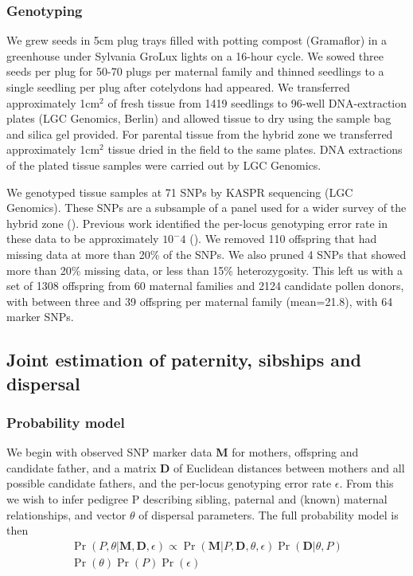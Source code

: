 \documentclass[10pt, a4paper, twocolumn]{article} %
\begin{document}
\subsubsection{Genotyping}

We grew seeds in 5cm plug trays filled with potting compost (Gramaflor) in a greenhouse under Sylvania GroLux lights on a 16-hour cycle. We sowed three seeds per plug for 50-70 plugs per maternal family and thinned seedlings to a single seedling per plug after cotelydons had appeared. We transferred approximately 1cm$^2$ of fresh tissue from 1419 seedlings to 96-well DNA-extraction plates (LGC Genomics, Berlin) and allowed tissue to dry using the sample bag and silica gel provided. For parental tissue from the hybrid zone we transferred approximately 1cm$^2$ tissue dried in the field to the same plates. DNA extractions of the plated tissue samples were carried out by LGC Genomics.

We genotyped tissue samples at 71 SNPs by KASPR sequencing (LGC Genomics).
These SNPs are a subsample of a panel used for a wider survey of the hybrid zone (\cite{surendranadh2022effects}).
Previous work identified the per-locus genotyping error rate in these data to be approximately $10^-4$ (\cite{surendranadh2022effects}).
We removed 110 offspring that had missing data at more than 20\% of the SNPs.
We also pruned 4 SNPs that showed more than 20\% missing data, or less than 15\% heterozygosity.
This left us with a set of 1308 offspring from 60 maternal families and 2124 candidate pollen donors, with between three and 39 offspring per maternal family (mean=21.8), with 64 marker SNPs.

\subsection{Joint estimation of paternity, sibships and dispersal}

\subsubsection{Probability model}

We begin with observed SNP marker data \textbf{M} for mothers, offspring and candidate father, and a matrix \textbf{D} of Euclidean distances between mothers and all possible candidate fathers, and the per-locus genotyping error rate $\epsilon$. From this we wish to infer pedigree P describing sibling, paternal and (known) maternal relationships, and vector $\theta$ of dispersal parameters. The full probability model is then
\begin{equation}
\label{eqn:probability_model}
\begin{split}
\Pr( P, \theta | \textbf{M}, \textbf{D}, \epsilon) \propto \Pr(\textbf{M} | P, \textbf{D}, \theta, \epsilon)
\Pr(\textbf{D} | \theta, P) \\
\Pr(\theta) \Pr(P) \Pr(\epsilon)
\end{split}
\end{equation}
\end{document}

